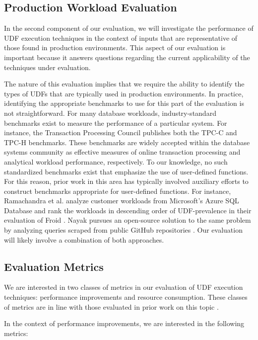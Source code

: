 \documentclass{vldb}
\begin{document}
\subsection{Production Workload Evaluation}

In the second component of our evaluation, we will investigate the performance of UDF execution techniques in the context of inputs that are representative of those found in production environments. This aspect of our evaluation is important because it answers questions regarding the current applicability of the techniques under evaluation.

The nature of this evaluation implies that we require the ability to identify the types of UDFs that are typically used in production environments. In practice, identifying the appropriate benchmarks to use for this part of the evaluation is not straightforward. For many database workloads, industry-standard benchmarks exist to measure the performance of a particular system. For instance, the Transaction Processing Council publishes both the TPC-C \cite{tpcc} and TPC-H \cite{tpch} benchmarks. These benchmarks are widely accepted within the database systems community as effective measures of online transaction processing and analytical workload performance, respectively. To our knowledge, no such standardized benchmarks exist that emphasize the use of user-defined functions. For this reason, prior work in this area has typically involved auxiliary efforts to construct benchmarks appropriate for user-defined functions. For instance, Ramachandra et al. analyze customer workloads from Microsoft's Azure SQL Database \cite{azure} and rank the workloads in descending order of UDF-prevalence in their evaluation of Froid \cite{froid}. Nayak pursues an open-source solution to the same problem by analyzing queries scraped from public GitHub \cite{github} repositories \cite{tanuj}. Our evaluation will likely involve a combination of both approaches.

\subsection{Evaluation Metrics}

We are interested in two classes of metrics in our evaluation of UDF execution techniques: performance improvements and resource consumption. These classes of metrics are in line with those evaluated in prior work on this topic \cite{froid, apfel}.

In the context of performance improvements, we are interested in the following metrics:
\end{document}
